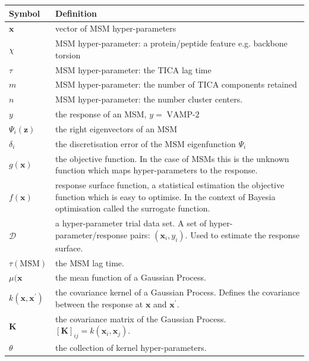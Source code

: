 \begin{table}
    \centering
    \begin{tabularx}{0.9\textwidth}{ |l| >{\raggedright\arraybackslash}X | } 
    \hline
        \textbf{Symbol}  &  \textbf{Definition} \\
        \hline\hline
        $\mathbf{x}$ & vector of MSM hyper-parameters \\
        $\chi$ & MSM hyper-parameter: a protein/peptide feature e.g. backbone torsion \\
        $\tau$ & MSM hyper-parameter: the TICA lag time \\
        $m$ & MSM hyper-parameter: the number of TICA components retained \\
        $n$ & MSM hyper-parameter: the number cluster centers. \\
        $y$ & the response of an MSM, $y =\operatorname{VAMP-2}$ \\
        $\Psi_i(\mathbf{z})$ & the right eigenvectors of an MSM \\
        $\delta_i$ & the discretisation error of the MSM eigenfunction $\Psi_{i}$ \\
        $g(\mathbf{x})$ & the objective function. In the case of MSMs this is the unknown function 
                            which maps hyper-parameters to the response. \\
        $f(\mathbf{x})$ & response surface function, a statistical estimation the objective function 
                          which is easy to optimise. In the context of Bayesia optimisation called the 
                          surrogate function. \\
        $\mathcal{D}$ & a hyper-parameter trial data set. A set of hyper-parameter/response pairs: $(\mathbf{x}_{i}, y_{i})$. Used to estimate the response surface. \\
        $\tau(\mathrm{MSM})$ & the MSM lag time.  \\
        $\mu(\mathbf{x}$ & the mean function of a Gaussian Process. \\
        $k(\mathbf{x}, \mathbf{x}^{\prime})$ & the covariance kernel of a Gaussian Process. Defines the covariance between the response at $\mathbf{x}$ and $\mathbf{x}^{\prime}$. \\
        $\mathbf{K}$ & the covariance matrix of the Gaussian Process. $[\mathbf{K}]_{ij} =k(\mathbf{x}_{i}, \mathbf{x}_{j})$. \\
        $\theta$ & the collection of kernel hyper-parameters. \\

\end{tabularx}
\end{table}
